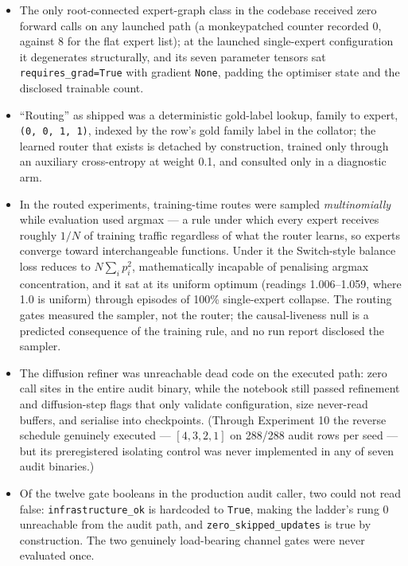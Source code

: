 \documentclass[10pt,a4paper]{article}
\begin{document}
\begin{itemize}\setlength{\itemsep}{0.1em}
  \item The only root-connected expert-graph class in the codebase received zero forward calls on any launched path (a monkeypatched counter recorded 0, against 8 for the flat expert list); at the launched single-expert configuration it degenerates structurally, and its seven parameter tensors sat \texttt{requires\_grad=True} with gradient \texttt{None}, padding the optimiser state and the disclosed trainable count.
  \item ``Routing'' as shipped was a deterministic gold-label lookup, family to expert, \texttt{(0,\,0,\,1,\,1)}, indexed by the row's gold family label in the collator; the learned router that exists is detached by construction, trained only through an auxiliary cross-entropy at weight 0.1, and consulted only in a diagnostic arm.
  \item In the routed experiments, training-time routes were sampled \emph{multinomially} while evaluation used argmax --- a rule under which every expert receives roughly $1/N$ of training traffic regardless of what the router learns, so experts converge toward interchangeable functions. Under it the Switch-style balance loss reduces to $N\sum_i p_i^2$, mathematically incapable of penalising argmax concentration, and it sat at its uniform optimum (readings 1.006--1.059, where 1.0 is uniform) through episodes of 100\% single-expert collapse. The routing gates measured the sampler, not the router; the causal-liveness null is a predicted consequence of the training rule, and no run report disclosed the sampler.
  \item The diffusion refiner was unreachable dead code on the executed path: zero call sites in the entire audit binary, while the notebook still passed refinement and diffusion-step flags that only validate configuration, size never-read buffers, and serialise into checkpoints. (Through Experiment 10 the reverse schedule genuinely executed --- $[4,3,2,1]$ on 288/288 audit rows per seed --- but its preregistered isolating control was never implemented in any of seven audit binaries.)
  \item Of the twelve gate booleans in the production audit caller, two could not read false: \texttt{infrastructure\_ok} is hardcoded to \texttt{True}, making the ladder's rung 0 unreachable from the audit path, and \texttt{zero\_skipped\_}\allowbreak\texttt{updates} is true by construction. The two genuinely load-bearing channel gates were never evaluated once.

\end{itemize}
\end{document}
